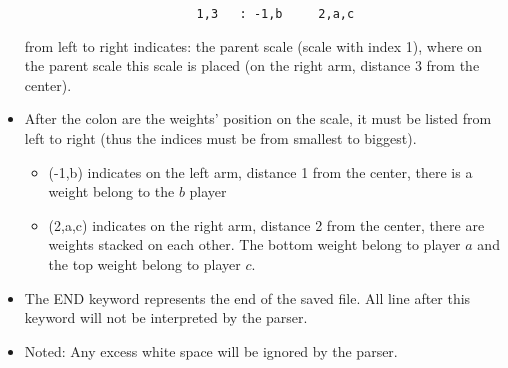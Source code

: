 \documentclass[12pt]{article}
\begin{document}
\begin{itemize}
    \begin{verbatim}
                        1,3   : -1,b     2,a,c
    \end{verbatim}
    from left to right indicates: the parent scale (scale with index 1), where
    on the parent scale this scale is placed (on the right arm, distance 3 from
    the center). 
  \item After the colon are the weights' position on the scale, it must be
    listed from left to right (thus the indices must be from smallest to
    biggest). 
    \begin{itemize}
      \item (-1,b) indicates on the left arm, distance 1 from the center, there
        is a weight belong to the $b$ player
      \item (2,a,c) indicates on the right arm, distance 2 from the center,
        there are weights stacked on each other. The bottom weight belong to
        player $a$ and the top weight belong to player $c$.
    \end{itemize}
  \item The END keyword represents the end of the saved file. All line after
    this keyword will not be interpreted by the parser.
  \item Noted: Any excess white space will be ignored by the parser.
\end{itemize}
\end{document}
